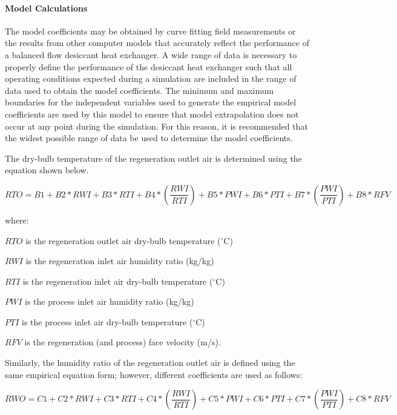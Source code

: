 \paragraph{Model Calculations}\label{model-calculations}

The model coefficients may be obtained by curve fitting field measurements or the results from other computer models that accurately reflect the performance of a balanced flow desiccant heat exchanger. A wide range of data is necessary to properly define the performance of the desiccant heat exchanger such that all operating conditions expected during a simulation are included in the range of data used to obtain the model coefficients. The minimum and maximum boundaries for the independent variables used to generate the empirical model coefficients are used by this model to ensure that model extrapolation does not occur at any point during the simulation. For this reason, it is recommended that the widest possible range of data be used to determine the model coefficients.

The dry-bulb temperature of the regeneration outlet air is determined using the equation shown below.

\begin{equation}
RTO = B1 + B2*RWI + B3*RTI + B4*\left( {\frac{{RWI}}{{RTI}}} \right) + B5*PWI + B6*PTI + B7*\left( {\frac{{PWI}}{{PTI}}} \right) + B8*RFV
\end{equation}

where:

\(RTO\) is the regeneration outlet air dry-bulb temperature (\(^{\circ}\)C)

\(RWI\) is the regeneration inlet air humidity ratio (kg/kg)

\(RTI\) is the regeneration inlet air dry-bulb temperature (\(^{\circ}\)C)

\(PWI\) is the process inlet air humidity ratio (kg/kg)

\(PTI\) is the process inlet air dry-bulb temperature (\(^{\circ}\)C)

\(RFV\) is the regeneration (and process) face velocity (m/s).

Similarly, the humidity ratio of the regeneration outlet air is defined using the same empirical equation form; however, different coefficients are used as follows:

\begin{equation}
RWO = C1 + C2*RWI + C3*RTI + C4*\left( {\frac{{RWI}}{{RTI}}} \right) + C5*PWI + C6*PTI + C7*\left( {\frac{{PWI}}{{PTI}}} \right) + C8*RFV
\end{equation}

